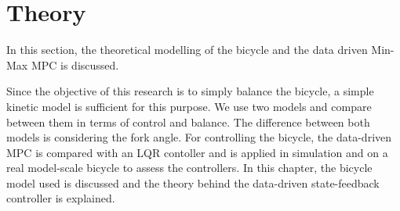 \chapter{Theory}
In this section, the theoretical modelling of the bicycle and the data driven Min-Max MPC is discussed.

Since the objective of this research is to simply balance the bicycle, a simple kinetic model is sufficient for this purpose. We use two models and compare between them in terms of control and balance.
The difference between both models is considering the fork angle.
For controlling the bicycle, the data-driven MPC is compared with an LQR contoller and is applied in simulation and on a real model-scale bicycle to assess the controllers. In this chapter, the bicycle model used is discussed and the theory behind the data-driven state-feedback controller is explained.

